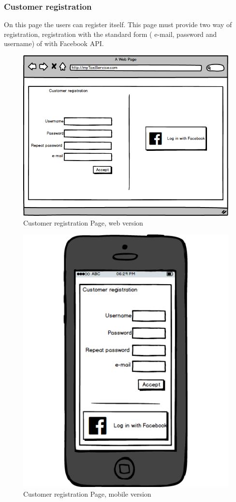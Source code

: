 \documentclass{report}
\begin{document}
			\subsubsection{Customer registration}
			On this page the users can register itself. This page must provide two way of registration, registration with the standard form ( e-mail, password and username) of with Facebook API.
			\begin{figure}[H]
			\centering
			\includegraphics[scale=0.5]{IMG/UserInterfaces/CustomerRegistration.png}
			\caption{Customer registration Page, web version}\label{visina8}
			\end{figure}
			\begin{figure}[H]
			\centering
			\includegraphics[scale=0.4]{IMG/UserInterfaces/CustomerRegistration_m.png}
			\caption{Customer registration Page, mobile version}\label{visina8}
			\end{figure}
			
\end{document}
